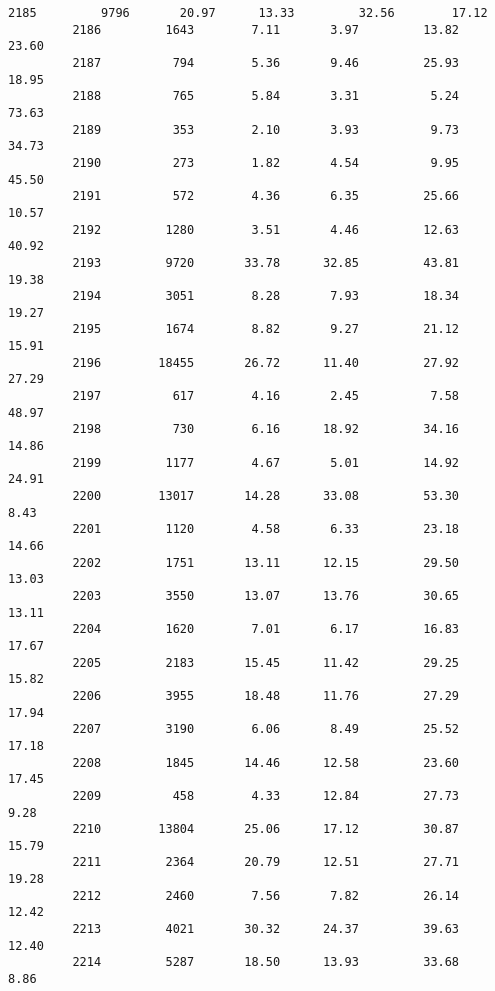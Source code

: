 \documentclass[11pt]{llncs}
\begin{document}
\begin{Verbatim}[commandchars=\\\{\}]
         2185         9796       20.97      13.33         32.56        17.12   
         2186         1643        7.11       3.97         13.82        23.60   
         2187          794        5.36       9.46         25.93        18.95   
         2188          765        5.84       3.31          5.24        73.63   
         2189          353        2.10       3.93          9.73        34.73   
         2190          273        1.82       4.54          9.95        45.50   
         2191          572        4.36       6.35         25.66        10.57   
         2192         1280        3.51       4.46         12.63        40.92   
         2193         9720       33.78      32.85         43.81        19.38   
         2194         3051        8.28       7.93         18.34        19.27   
         2195         1674        8.82       9.27         21.12        15.91   
         2196        18455       26.72      11.40         27.92        27.29   
         2197          617        4.16       2.45          7.58        48.97   
         2198          730        6.16      18.92         34.16        14.86   
         2199         1177        4.67       5.01         14.92        24.91   
         2200        13017       14.28      33.08         53.30         8.43   
         2201         1120        4.58       6.33         23.18        14.66   
         2202         1751       13.11      12.15         29.50        13.03   
         2203         3550       13.07      13.76         30.65        13.11   
         2204         1620        7.01       6.17         16.83        17.67   
         2205         2183       15.45      11.42         29.25        15.82   
         2206         3955       18.48      11.76         27.29        17.94   
         2207         3190        6.06       8.49         25.52        17.18   
         2208         1845       14.46      12.58         23.60        17.45   
         2209          458        4.33      12.84         27.73         9.28   
         2210        13804       25.06      17.12         30.87        15.79   
         2211         2364       20.79      12.51         27.71        19.28   
         2212         2460        7.56       7.82         26.14        12.42   
         2213         4021       30.32      24.37         39.63        12.40   
         2214         5287       18.50      13.93         33.68         8.86   
         

\end{Verbatim}
\end{document}
